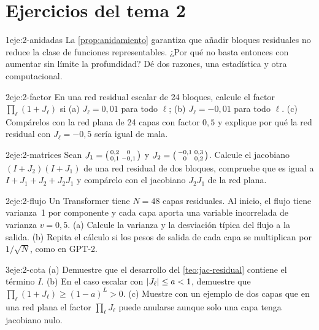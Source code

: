 \section*{Ejercicios del tema 2}

\begin{ejercicio}{1}{eje:2-anidadas}
La \cref{prop:anidamiento} garantiza que añadir bloques residuales no reduce la clase de funciones representables. ¿Por qué no basta entonces con aumentar sin límite la profundidad? Dé dos razones, una estadística y otra computacional.
\end{ejercicio}

\begin{ejercicio}{2}{eje:2-factor}
En una red residual escalar de 24 bloques, calcule el factor $\prod_\ell(1+J_\ell)$ si (a) $J_\ell=0{,}01$ para todo $\ell$; (b) $J_\ell=-0{,}01$ para todo $\ell$. (c) Compárelos con la red plana de 24 capas con factor $0{,}5$ y explique por qué la red residual con $J_\ell=-0{,}5$ sería igual de mala.
\end{ejercicio}

\begin{ejercicio}{2}{eje:2-matrices}
Sean $J_1=\begin{psmallmatrix}0{,}2&0\\0{,}1&-0{,}1\end{psmallmatrix}$ y $J_2=\begin{psmallmatrix}-0{,}1&0{,}3\\0&0{,}2\end{psmallmatrix}$. Calcule el jacobiano $(I+J_2)(I+J_1)$ de una red residual de dos bloques, compruebe que es igual a $I+J_1+J_2+J_2J_1$ y compárelo con el jacobiano $J_2J_1$ de la red plana.
\end{ejercicio}

\begin{ejercicio}{2}{eje:2-flujo}
Un Transformer tiene $N=48$ capas residuales. Al inicio, el flujo tiene varianza~1 por componente y cada capa aporta una variable incorrelada de varianza $v=0{,}5$. (a) Calcule la varianza y la desviación típica del flujo a la salida. (b) Repita el cálculo si los pesos de salida de cada capa se multiplican por $1/\sqrt{N}$, como en GPT-2.
\end{ejercicio}

\begin{ejercicio}{3}{eje:2-cota}
(a) Demuestre que el desarrollo del \cref{teo:jac-residual} contiene el término $I$. (b) En el caso escalar con $\lvert J_\ell\rvert\le a<1$, demuestre que $\prod_\ell(1+J_\ell)\ge(1-a)^{L}>0$. (c) Muestre con un ejemplo de dos capas que en una red plana el factor $\prod_\ell J_\ell$ puede anularse aunque solo una capa tenga jacobiano nulo.
\end{ejercicio}
